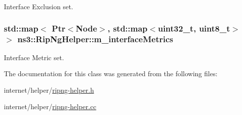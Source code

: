 Interface Exclusion set. 

\subsubsection[{\texorpdfstring{m\+\_\+interface\+Metrics}{m_interfaceMetrics}}]{\setlength{\rightskip}{0pt plus 5cm}std\+::map$<$ {\bf Ptr}$<${\bf Node}$>$, std\+::map$<$uint32\+\_\+t, uint8\+\_\+t$>$ $>$ ns3\+::\+Rip\+Ng\+Helper\+::m\+\_\+interface\+Metrics\hspace{0.3cm}{\ttfamily [private]}}\hypertarget{classns3_1_1RipNgHelper_a290cfef7a9bed83564de3fd950b8f6cd}{}\label{classns3_1_1RipNgHelper_a290cfef7a9bed83564de3fd950b8f6cd}


Interface Metric set. 



The documentation for this class was generated from the following files\+:\begin{DoxyCompactItemize}
\item 
internet/helper/\hyperlink{ripng-helper_8h}{ripng-\/helper.\+h}\item 
internet/helper/\hyperlink{ripng-helper_8cc}{ripng-\/helper.\+cc}\end{DoxyCompactItemize}
